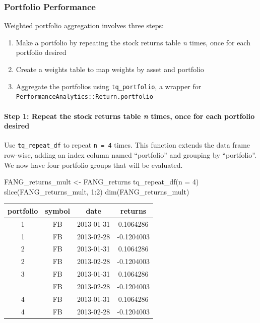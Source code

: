 \subsubsection{Portfolio Performance}\label{portfolio-performance}

Weighted portfolio aggregation involves three steps:

\begin{enumerate}
\def\labelenumi{\arabic{enumi}.}
\tightlist
\item
  Make a portfolio by repeating the stock returns table \emph{n} times,
  once for each portfolio desired
\item
  Create a weights table to map weights by asset and portfolio
\item
  Aggregate the portfolios using \texttt{tq\_portfolio}, a wrapper for
  \texttt{PerformanceAnalytics::Return.portfolio}
\end{enumerate}

\paragraph{\texorpdfstring{Step 1: Repeat the stock returns table
\emph{n} times, once for each portfolio
desired}{Step 1: Repeat the stock returns table n times, once for each portfolio desired}}\label{step-1-repeat-the-stock-returns-table-n-times-once-for-each-portfolio-desired}

Use \texttt{tq\_repeat\_df} to repeat \texttt{n\ =\ 4} times. This
function extends the data frame row-wise, adding an index column named
``portfolio'' and grouping by ``portfolio''. We now have four portfolio
groups that will be evaluated.

\begin{Schunk}
\begin{Sinput}
FANG_returns_mult <- FANG_returns %
    tq_repeat_df(n = 4)
slice(FANG_returns_mult, 1:2)
dim(FANG_returns_mult)
\end{Sinput}
\end{Schunk}

\begin{tabular}{cccc}
\toprule
portfolio & symbol & date & returns\\
\midrule
1 & FB & 2013-01-31 & 0.1064286\\
1 & FB & 2013-02-28 & -0.1204003\\
2 & FB & 2013-01-31 & 0.1064286\\
2 & FB & 2013-02-28 & -0.1204003\\
3 & FB & 2013-01-31 & 0.1064286\\
\addlinespace
3 & FB & 2013-02-28 & -0.1204003\\
4 & FB & 2013-01-31 & 0.1064286\\
4 & FB & 2013-02-28 & -0.1204003\\
\bottomrule
\end{tabular}

